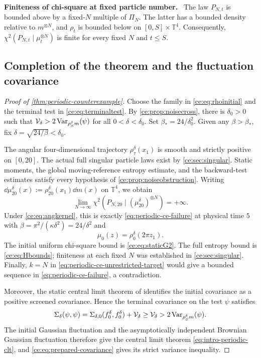 \documentclass[11pt,reqno]{amsart}
\numberwithin{equation}{section}
\theoremstyle{plain}
\theoremstyle{remark}
\newcommand{\T}{\mathbb T}\newcommand{\R}{\mathbb R}\newcommand{\Z}{\mathbb Z}
\newcommand{\parheading}[1]{\par\medskip\noindent\textbf{#1}\ }
\begin{document}
\parheading{Finiteness of chi-square at fixed particle number.}
The law $P_{N,t}$ is bounded above by a fixed-$N$ multiple of $\Pi_N$. The latter has a bounded density relative to $m^{\otimes N}$, and $\rho_t$ is bounded below on $[0,S]\times\T^4$. Consequently, $\chi^2(P_{N,t}\mid\mu_t^{\otimes N})$ is finite for every fixed $N$ and $t\le S$.

\subsection{Completion of the theorem and the fluctuation covariance}\label{ce:sec:completion}

\begin{proof}[Proof of \cref{thm:periodic-counterexample}]
Choose the family in \eqref{ce:eq:rhoinitial} and the terminal test in \eqref{ce:eq:terminaltest}. By \cref{ce:prop:noisecross}, there is $\delta_0>0$ such that $\mathcal V_\delta>2\operatorname{Var}_{\rho^\delta_Sm}(\psi)$ for all $0<\delta<\delta_0$. Set $\beta_*=24/\delta_0^2$. Given any $\beta>\beta_*$, fix $\delta=\sqrt{24/\beta}<\delta_0$.

The angular four-dimensional trajectory $\rho^\delta_\tau(x_1)$ is smooth and strictly positive on $[0,20]$. The actual full singular particle laws exist by \cref{ce:sec:singular}. Static moments, the global moving-reference entropy estimate, and the backward-test estimates satisfy every hypothesis of \cref{ce:prop:noiseobstruction}. Writing $\dd\mu_{20}^\delta(x):=\rho_{20}^\delta(x_1)\dd m(x)$ on $\T^4$, we obtain
\begin{equation}\label{ce:eq:angular-final-divergence}
 \lim_{N\to\infty}\chi^2(P_{N,20}\mid(\mu_{20}^\delta)^{\otimes N})=+\infty.
\end{equation} Under \eqref{ce:eq:angkernel}, this is exactly \cref{eq:periodic-ce-failure} at physical time $5$ with $\beta=\pi^2/(\kappa\delta^2)=24/\delta^2$ and
\begin{equation}\label{ce:eq:physicalprofile}
 \mu_0(z)=\rho^\delta_0(2\pi z_1).
\end{equation}
The initial uniform chi-square bound is \eqref{ce:eq:staticG2}. The full entropy bound is \eqref{ce:eq:Hbounds}; finiteness at each fixed $N$ was established in \cref{ce:sec:singular}. Finally, $k=N$ in \cref{eq:periodic-ce-unrestricted-target} would give a bounded sequence in \cref{eq:periodic-ce-failure}, a contradiction.

Moreover, the static central limit theorem of \cite[Proposition 2.11]{DGRpartition} identifies the initial covariance as a positive screened covariance. Hence the terminal covariance on the test $\psi$ satisfies
\begin{equation}\label{ce:eq:prepared-covariance}
 \Sigma_\delta(\psi,\psi)
 =\Sigma_{\delta,0}(f^\delta_0,f^\delta_0)+\mathcal V_\delta
 \ge\mathcal V_\delta>2\operatorname{Var}_{\rho^\delta_Sm}(\psi).
\end{equation}
The initial Gaussian fluctuation and the asymptotically independent Brownian Gaussian fluctuation therefore give the central limit theorem \eqref{eq:intro-periodic-clt}, and \eqref{ce:eq:prepared-covariance} gives its strict variance inequality.
\end{proof}
\end{document}
